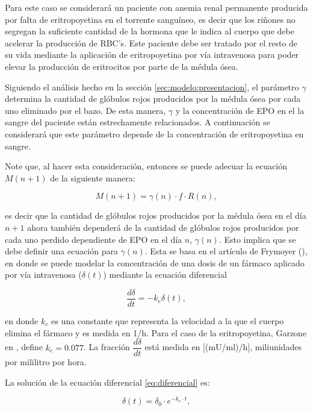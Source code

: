 Para este caso se considerará un paciente con anemia renal permanente producida por falta de eritropoyetina en el torrente sanguíneo, es decir que los riñones no segregan la suficiente cantidad de la hormona que le indica al cuerpo que debe acelerar la producción de RBC's. Este paciente debe ser tratado por el resto de su vida mediante la aplicación de eritropoyetina por vía intravenosa para poder elevar la producción de eritrocitos por parte de la médula ósea. 

Siguiendo el análisis hecho en la sección \ref{sec:modelo:presentacion}, el parámetro $\gamma$ determina la cantidad de glóbulos rojos producidos por la médula ósea por cada uno eliminado por el bazo. De esta manera, $\gamma$ y la concentración de EPO en el la sangre del paciente están estrechamente relacionados. A continuación se considerará que este parámetro depende de la concentración de eritropoyetina en sangre.

Note que, al hacer esta consideración, entonces se puede adecuar la ecuación $M(n+1)$ de la siguiente manera:

\begin{equation*}
    M(n+1)=\gamma(n)\cdot f \cdot R(n),
\end{equation*}

es decir que la cantidad de glóbulos rojos producidos por la médula ósea en el día $n+1$ ahora también dependerá de la cantidad de glóbulos rojos producidos por cada uno perdido dependiente de EPO en el día $n$, $\gamma(n)$. Esto implica que se debe definir una ecuación para $\gamma(n)$. Esta se basa en el artículo de Frymoyer (\cite{FRYMOYER2019123}), en donde se puede modelar la concentración de una dosis de un fármaco aplicado por vía intravenosa ($\delta(t)$) mediante la ecuación diferencial

\begin{equation}\label{eq:diferencial}
    \dfrac{d\delta}{dt}=-k_e \delta(t),
\end{equation}

en donde $k_e$ es una constante que representa la velocidad a la que el cuerpo elimina el fármaco y es medida en 1/h. Para el caso de la eritropoyetina, Garzone en \cite{GARZONE2012547}, define $k_e=0.077$. La fracción $\dfrac{d\delta}{dt}$ está medida en [(mU/ml)/h], miliunidades por mililitro por hora.

La solución de la ecuación diferencial \ref{eq:diferencial} es:

\begin{equation}\label{eq:solucionDif}
    \delta(t)=\delta_0\cdot e^{-k_e\cdot t},
\end{equation}

